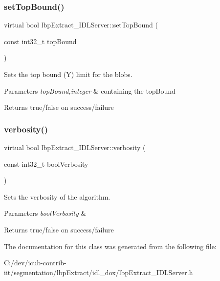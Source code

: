\subsubsection{\texorpdfstring{setTopBound()}{setTopBound()}}
{\footnotesize\ttfamily virtual bool lbp\+Extract\+\_\+\+I\+D\+L\+Server\+::set\+Top\+Bound (\begin{DoxyParamCaption}\item[{const int32\+\_\+t}]{top\+Bound }\end{DoxyParamCaption})\hspace{0.3cm}{\ttfamily [virtual]}}



Sets the top bound (Y) limit for the blobs. 


\begin{DoxyParams}{Parameters}
{\em top\+Bound,integer} & containing the top\+Bound \\
\hline
\end{DoxyParams}
\begin{DoxyReturn}{Returns}
true/false on success/failure 
\end{DoxyReturn}
\mbox{\label{classlbpExtract__IDLServer_a1b9021d363199f1a334c7ec2c23801b1}} 
\subsubsection{\texorpdfstring{verbosity()}{verbosity()}}
{\footnotesize\ttfamily virtual bool lbp\+Extract\+\_\+\+I\+D\+L\+Server\+::verbosity (\begin{DoxyParamCaption}\item[{const int32\+\_\+t}]{bool\+Verbosity }\end{DoxyParamCaption})\hspace{0.3cm}{\ttfamily [virtual]}}



Sets the verbosity of the algorithm. 


\begin{DoxyParams}{Parameters}
{\em bool\+Verbosity} & \\
\hline
\end{DoxyParams}
\begin{DoxyReturn}{Returns}
true/false on success/failure 
\end{DoxyReturn}


The documentation for this class was generated from the following file\+:\begin{DoxyCompactItemize}
\item 
C\+:/dev/icub-\/contrib-\/iit/segmentation/lbp\+Extract/idl\+\_\+dox/lbp\+Extract\+\_\+\+I\+D\+L\+Server.\+h\end{DoxyCompactItemize}
